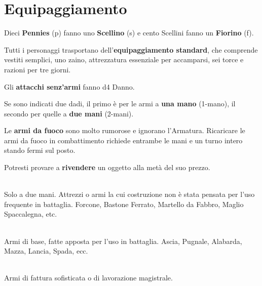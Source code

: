 \documentclass[itdr]{subfiles}
\begin{document}
\vfill
{}

\vfill
\clearpage


\section{Equipaggiamento}

Dieci \textbf{Pennies} (p) fanno uno \textbf{Scellino} (s) e cento Scellini fanno un \textbf{Fiorino} (f).

\vfill

Tutti i personaggi trasportano dell'\textbf{equipaggiamento standard}, che comprende vestiti semplici, uno zaino, attrezzatura essenziale per accamparsi, sei torce e razioni per tre giorni.

\vfill

Gli \textbf{attacchi senz’armi} fanno d4 Danno.

\vfill

Se sono indicati due dadi, il primo è per le armi a \textbf{una mano} (1-mano), il secondo per quelle a \textbf{due mani} (2-mani).

\vfill

Le \textbf{armi da fuoco} sono molto rumorose e ignorano l’Armatura. Ricaricare le armi da fuoco in combattimento richiede entrambe le mani e un turno intero stando fermi sul posto.

\vfill

Potresti provare a \textbf{rivendere} un oggetto alla metà del suo prezzo.

\vfill


\\Solo a due mani. Attrezzi o armi la cui costruzione non è stata pensata per l’uso frequente in battaglia. Forcone, Bastone Ferrato, Martello da Fabbro, Maglio Spaccalegna, etc.

\\Armi di base, fatte apposta per l’uso in battaglia. Ascia, Pugnale, Alabarda, Mazza, Lancia, Spada, ecc.

\\Armi di fattura sofisticata o di lavorazione magistrale.
\end{document}
